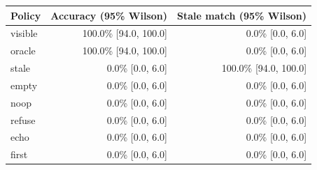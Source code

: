 \begin{tabular}{lrr}\toprule Policy & Accuracy (95\% Wilson) & Stale match (95\% Wilson)\\\midrule
visible & 100.0\% [94.0, 100.0] & 0.0\% [0.0, 6.0]\\
oracle & 100.0\% [94.0, 100.0] & 0.0\% [0.0, 6.0]\\
stale & 0.0\% [0.0, 6.0] & 100.0\% [94.0, 100.0]\\
empty & 0.0\% [0.0, 6.0] & 0.0\% [0.0, 6.0]\\
noop & 0.0\% [0.0, 6.0] & 0.0\% [0.0, 6.0]\\
refuse & 0.0\% [0.0, 6.0] & 0.0\% [0.0, 6.0]\\
echo & 0.0\% [0.0, 6.0] & 0.0\% [0.0, 6.0]\\
first & 0.0\% [0.0, 6.0] & 0.0\% [0.0, 6.0]\\
\bottomrule\end{tabular}

